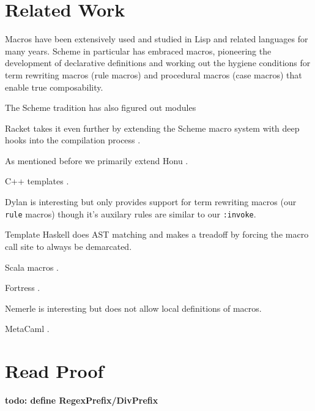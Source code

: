 \documentclass[preprint,10pt]{sigplanconf}
\begin{document}
\section{Related Work}
\label{sec:related}

Macros have been extensively used and studied in Lisp\cite{Foderaro1983,Pitman1980} and related languages for many years. Scheme in particular has embraced macros, pioneering the development of declarative definitions \cite{Kohlbecker1987} and working out the hygiene conditions for term rewriting macros (rule macros) \cite{Clinger1991} and procedural macros (case macros) \cite{Hieb1992} that enable true composability.

The Scheme tradition has also figured out modules \cite{Flatt2002,Ghuloum2007}

Racket takes it even further by extending the Scheme macro system with deep hooks into the compilation process \cite{Flatt2012,Tobin-Hochstadt2011}.

As mentioned before we primarily extend Honu \cite{Rafkind2012,Rafkind2013}.

C++ templates \cite{Alexandrescu2001}.

Dylan is interesting \cite{Bachrach1999} but only provides support for term rewriting macros (our \verb!rule! macros) though it's auxilary rules are similar to our \verb!:invoke!.

Template Haskell \cite{Sheard2002} does AST matching and makes a treadoff by forcing the macro call site to always be demarcated. 

Scala macros \cite{Burmako2013}.

Fortress \cite{Allen2009}.

Nemerle \cite{Skalski2004} is interesting but does not allow local definitions of macros.

MetaCaml \cite{Taha1997,Martel1997}.




\appendix

\clearpage

\section{Read Proof}

\textbf{todo: define RegexPrefix/DivPrefix}

\end{document}

